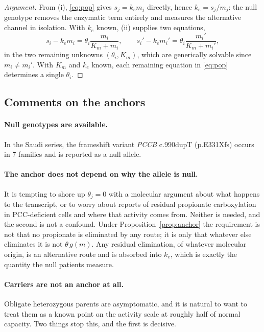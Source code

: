 \documentclass[11pt,a4paper]{article}
\begin{document}
\begin{proof}[Argument]
From (i), \eqref{eq:pop} gives $s_j = k_e m_j$ directly, hence $k_e = s_j / m_j$: the null
genotype removes the enzymatic term entirely and measures the alternative channel in
isolation. With $k_e$ known, (ii) supplies two equations,
\[
s_i - k_e m_i = \theta_i \frac{m_i}{K_m + m_i}, \qquad
s_i' - k_e m_i' = \theta_i \frac{m_i'}{K_m + m_i'},
\]
in the two remaining unknowns $(\theta_i, K_m)$, which are generically solvable since
$m_i \neq m_i'$. With $K_m$ and $k_e$ known, each remaining equation in \eqref{eq:pop}
determines a single $\theta_i$.
\end{proof}

\subsection{Comments on the anchors}

\paragraph{Null genotypes are available.} In the Saudi series, the frameshift variant
\emph{PCCB} c.990dupT (p.E331Xfs) occurs in 7 families and is reported as a null allele.

\paragraph{The anchor does not depend on why the allele is null.} It is tempting to shore
up $\theta_j = 0$ with a molecular argument about what happens to the transcript, or to
worry about reports of residual propionate carboxylation in PCC-deficient cells and where
that activity comes from. Neither is needed, and the second is not a confound. Under
Proposition~\ref{prop:anchor} the requirement is not that no propionate is eliminated by
any route; it is only that whatever else eliminates it is not $\theta\, g(m)$. Any residual
elimination, of whatever molecular origin, is an alternative route and is absorbed into
$k_e$, which is exactly the quantity the null patients measure.

\paragraph{Carriers are not an anchor at all.} Obligate heterozygous parents are
asymptomatic, and it is natural to want to treat them as a known point on the activity
scale at roughly half of normal capacity. Two things stop this, and the first is decisive.
\end{document}
